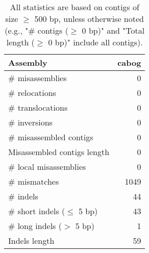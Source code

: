 \documentclass[12pt,a4paper]{article}
\begin{document}
\begin{table}[ht]
\begin{center}
\caption{All statistics are based on contigs of size $\geq$ 500 bp, unless otherwise noted (e.g., "\# contigs ($\geq$ 0 bp)" and "Total length ($\geq$ 0 bp)" include all contigs).}
\begin{tabular}{|l*{1}{|r}|}
\hline
Assembly & cabog \\ \hline
\# misassemblies & 0 \\ \hline
\hspace{5mm}\# relocations & 0 \\ \hline
\hspace{5mm}\# translocations & 0 \\ \hline
\hspace{5mm}\# inversions & 0 \\ \hline
\# misassembled contigs & 0 \\ \hline
Misassembled contigs length & 0 \\ \hline
\# local misassemblies & 0 \\ \hline
\# mismatches & 1049 \\ \hline
\# indels & 44 \\ \hline
\hspace{5mm}\# short indels ($\leq$ 5 bp) & 43 \\ \hline
\hspace{5mm}\# long indels ($>$ 5 bp) & 1 \\ \hline
Indels length & 59 \\ \hline
\end{tabular}
\end{center}
\end{table}
\end{document}

